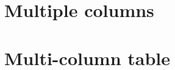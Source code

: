 \documentclass{article}
\begin{document}




\section{Multiple columns}



\section{Multi-column table}
\end{document}
